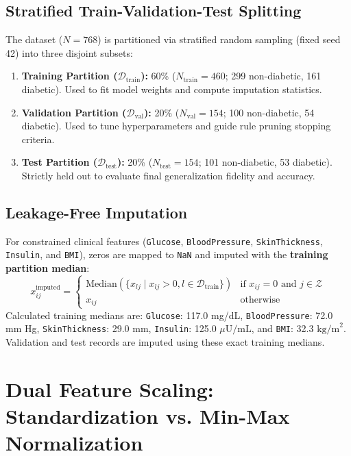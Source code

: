 \documentclass{report}
\begin{document}
\subsection{Stratified Train-Validation-Test Splitting}
The dataset ($N = 768$) is partitioned via stratified random sampling (fixed seed 42) into three disjoint subsets:
\begin{enumerate}
    \setlength{\itemsep}{0pt}
    \setlength{\parskip}{0pt}
    \item \textbf{Training Partition ($\mathcal{D}_{\text{train}}$):} 60\% ($N_{\text{train}} = 460$; 299 non-diabetic, 161 diabetic). Used to fit model weights and compute imputation statistics.
    \item \textbf{Validation Partition ($\mathcal{D}_{\text{val}}$):} 20\% ($N_{\text{val}} = 154$; 100 non-diabetic, 54 diabetic). Used to tune hyperparameters and guide rule pruning stopping criteria.
    \item \textbf{Test Partition ($\mathcal{D}_{\text{test}}$):} 20\% ($N_{\text{test}} = 154$; 101 non-diabetic, 53 diabetic). Strictly held out to evaluate final generalization fidelity and accuracy.
\end{enumerate}

\subsection{Leakage-Free Imputation}
For constrained clinical features (\texttt{Glucose}, \texttt{BloodPressure}, \texttt{SkinThickness}, \texttt{Insulin}, and \texttt{BMI}), zeros are mapped to \texttt{NaN} and imputed with the \textbf{training partition median}:
\begin{equation}
    x_{ij}^{\text{imputed}} = \begin{cases} 
    \text{Median}\left(\{ x_{lj} \mid x_{lj} > 0, l \in \mathcal{D}_{\text{train}} \}\right) & \text{if } x_{ij} = 0 \text{ and } j \in \mathcal{Z} \\
    x_{ij} & \text{otherwise}
    \end{cases}
\end{equation}
Calculated training medians are: \texttt{Glucose}: 117.0 mg/dL, \texttt{BloodPressure}: 72.0 mm Hg, \texttt{SkinThickness}: 29.0 mm, \texttt{Insulin}: 125.0 $\mu\text{U/mL}$, and \texttt{BMI}: 32.3 $\text{kg/m}^2$. Validation and test records are imputed using these exact training medians.

\section{Dual Feature Scaling: Standardization vs. Min-Max Normalization}
\end{document}
